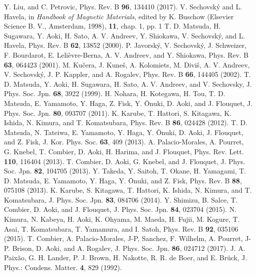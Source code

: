 \documentclass[twocolumn,showpacs,preprintnumbers,amsmath,amssymb]{revtex4}
\begin{document}
\begin{references}
 Y. Liu, and C. Petrovic, Phys. Rev. B {\bf 96}, 134410 (2017).
  V. Sechovsk{\'y} and L. Havela, in {\it Handbook of Magnetic Materials}, edited by K. Buschow (Elsevier Science B. V., Amsterdam, 1998), {\bf 11}, chap. 1, pp. 1
 T. D. Matsuda, H. Sugawara, Y. Aoki, H. Sato, A. V. Andreev, Y. Shiokawa, V. Sechovsk{\'y}, and L. Havela, Phys. Rev. B {\bf 62}, 13852 (2000). %
 P. Javorsk{\'y}, V. Sechovsk{\'y}, J. Schweizer, F. Bourdarot, E. Leli{\`e}vre-Berna, A. V. Andreev, and Y. Shiokawa,  Phys. Rev. B {\bf 63}, 064423 (2001). %
 M. Ku{\v{c}}era, J. Kune{\v{s}}, A. Kolomiets, M. Divi{\v{s}}, A. V. Andreev, V. Sechovsk{\'y}, J. P. Kappler, and A. Rogalev, Phys. Rev. B {\bf 66}, 144405 (2002).%
 T. D. Matsuda, Y. Aoki, H. Sugawara, H. Sato, A. V. Andreev, and V. Sechovsky, J. Phys. Soc. Jpn. {\bf 68}, 3922 (1999).%
 H. Nohara, H. Kotegawa, H. Tou, T. D. Matsuda, E. Yamamoto, Y. Haga, Z. Fisk, Y. {\=O}nuki, D. Aoki, and J. Flouquet, J. Phys. Soc. Jpn. {\bf 80}, 093707 (2011). %
 K. Karube, T. Hattori, S. Kitagawa, K. Ishida, N. Kimura, and T. Komatsubara, Phys. Rev. B {\bf 86}, 024428 (2012). %
 T. D. Matsuda, N. Tateiwa, E. Yamamoto, Y. Haga, Y. {\=O}nuki, D. Aoki, J. Flouquet, and Z. Fisk, J. Kor. Phys. Soc. {\bf 63}, 409 (2013).%
  A. Palacio-Morales, A. Pourret, G. Knebel, T. Combier, D. Aoki, H. Harima, and J. Flouquet, Phys. Rev. Lett. {\bf 110}, 116404 (2013).%
  T. Combier, D. Aoki, G. Knebel, and J. Flouquet,  J. Phys. Soc. Jpn. {\bf 82}, 104705 (2013).%
  Y. Takeda, Y. Saitoh, T. Okane, H. Yamagami, T. D. Matsuda, E. Yamamoto, Y. Haga, Y. {\=O}nuki, and Z. Fisk, Phys. Rev. B {\bf 88}, 075108 (2013). %
 K. Karube, S. Kitagawa, T. Hattori, K. Ishida, N. Kimura, and T. Komatsubara, J. Phys. Soc. Jpn. {\bf 83}, 084706 (2014).%
  Y. Shimizu, B. Salce, T. Combier, D. Aoki, and J. Flouquet, J. Phys. Soc. Jpn. {\bf 84}, 023704 (2015).%
  N. Kimura, N. Kabeya, H. Aoki, K. Ohyama, M. Maeda, H. Fujii, M. Kogure, T. Asai, T. Komatsubara, T. Yamamura, and I. Satoh, Phys. Rev. B {\bf 92}, 035106 (2015).%
  T. Combier, A. Palacio-Morales, J-P, Sanchez, F. Wilhelm, A. Pourret, J-P. Brison, D. Aoki, and A. Rogalev, J. Phys. Soc. Jpn. {\bf 86}, 024712 (2017).%
 J. A. Paix{\~a}o, G. H. Lander, P. J. Brown, H. Nakotte, R. R. de Boer, and E. Br{\"u}ck, J. Phys.: Condens. Matter. {\bf 4}, 829 (1992).%

\end{references}
\end{document}
